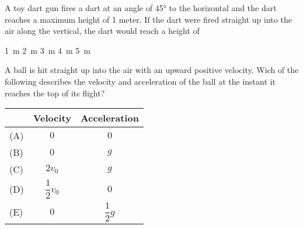 \documentclass{../../../oss-ap12ibhl-print}
\begin{document}
\begin{questions}
\begin{oneparchoices}
    \choice
    \choice
  \end{oneparchoices}

  \uplevel{\rule{\linewidth}{.6pt}}
  
  \question A toy dart gun fires a dart at an angle of \ang{45} to the
  horizontal and the dart reaches a maximum height of 1 meter. If the dart
  were fired straight up into the air along the vertical, the dart would
  reach a height of
  
  \begin{oneparchoices}
    \choice\SI{1}{\metre}\hspace{.4in}
    \choice\SI{2}{\metre}\hspace{.4in}
    \choice\SI{3}{\metre}\hspace{.4in}
    \choice\SI{4}{\metre}\hspace{.4in}
    \choice\SI{5}{\metre}
  \end{oneparchoices}

  \uplevel{\rule{\linewidth}{.6pt}}
  
  \question A ball is hit straight up into the air with an upward positive
  velocity. Wich of the following describes the velocity and acceleration
  of the ball at the instant it reaches the top of its flight?
  
  \begin{tabular}{lcc}
    & Velocity & Acceleration\\ \hline
    (A) & $0$ & $0$\\
    (B) & $0$ & $g$\\
    (C) & $2v_0$ & $g$\\
    (D) & $\dfrac12v_0$ & $0$\\
    (E) & $0$ & $\dfrac12g$
  \end{tabular}
  \uplevel{\rule{\linewidth}{.6pt}}
  

\end{questions}
\end{document}
